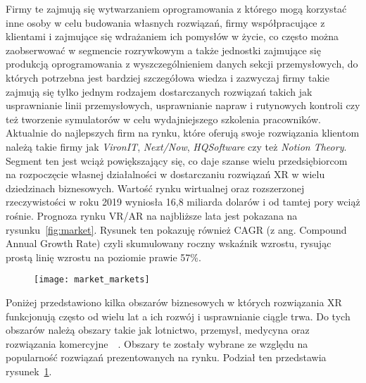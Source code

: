   Firmy te zajmują się wytwarzaniem oprogramowania z którego mogą korzystać inne osoby w celu budowania własnych rozwiązań, firmy współpracujące z klientami i zajmujące się wdrażaniem ich pomysłów w życie, co często można zaobserwować w segmencie rozrywkowym a także jednostki zajmujące się produkcją oprogramowania z wyszczególnieniem danych sekcji przemysłowych, do których potrzebna jest bardziej szczegółowa wiedza i zazwyczaj firmy takie zajmują się tylko jednym rodzajem dostarczanych rozwiązań takich jak usprawnianie linii przemysłowych, usprawnianie napraw i rutynowych kontroli czy też tworzenie symulatorów w celu wydajniejszego szkolenia pracowników. Aktualnie do najlepszych firm na rynku, które oferują swoje rozwiązania klientom należą takie firmy jak \textit{VironIT}, \textit{Next/Now}, \textit{HQSoftware} czy też \textit{Notion Theory}. Segment ten jest wciąż powiększający się, co daje szanse wielu przedsiębiorcom na rozpoczęcie własnej działalności w dostarczaniu rozwiązań XR w wielu dziedzinach biznesowych. Wartość rynku  wirtualnej oraz rozszerzonej rzeczywistości w  roku 2019 wyniosła 16,8 miliarda dolarów i od tamtej pory wciąż rośnie. Prognoza rynku VR/AR na najbliższe lata jest pokazana na rysunku~\ref{fig:market}. Rysunek ten pokazuję również CAGR (z ang. Compound Annual Growth Rate) czyli skumulowany roczny wskaźnik wzrostu, rysując prostą linię wzrostu na poziomie prawie 57\%. 
   \begin{figure}[h]
\centering
\texttt{[image: market\_markets]}
\label{fig:market_m}
\end{figure}
 Poniżej przedstawiono kilka obszarów biznesowych w których rozwiązania XR funkcjonują często od wielu lat a ich rozwój i usprawnianie ciągle trwa. Do tych obszarów należą obszary takie jak lotnictwo, przemysł, medycyna oraz rozwiązania komercyjne~\cite{firmy}~\cite{vr4bus}. Obszary te zostały wybrane ze względu na popularność rozwiązań prezentowanych na rynku. Podział ten przedstawia rysunek~\ref{fig:market_m}.
